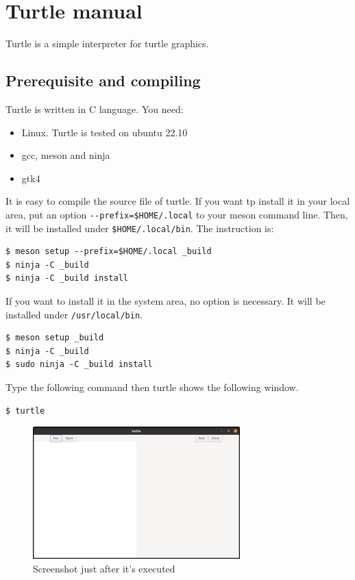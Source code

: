 \section{Turtle manual}\label{turtle-manual}

Turtle is a simple interpreter for turtle graphics.

\subsection{Prerequisite and
compiling}\label{prerequisite-and-compiling}

Turtle is written in C language. You need:

\begin{itemize}
\tightlist
\item
  Linux. Turtle is tested on ubuntu 22.10
\item
  gcc, meson and ninja
\item
  gtk4
\end{itemize}

It is easy to compile the source file of turtle. If you want tp install
it in your local area, put an option
\passthrough{\lstinline!--prefix=$HOME/.local!} to your meson command
line. Then, it will be installed under
\passthrough{\lstinline!$HOME/.local/bin!}. The instruction is:

\begin{lstlisting}
$ meson setup --prefix=$HOME/.local _build
$ ninja -C _build
$ ninja -C _build install
\end{lstlisting}

If you want to install it in the system area, no option is necessary. It
will be installed under \passthrough{\lstinline!/usr/local/bin!}.

\begin{lstlisting}
$ meson setup _build
$ ninja -C _build
$ sudo ninja -C _build install
\end{lstlisting}

Type the following command then turtle shows the following window.

\begin{lstlisting}
$ turtle
\end{lstlisting}

\begin{figure}
\centering
\includegraphics[width=8cm,height=5.11cm]{../src/turtle/image/turtle1.png}
\caption{Screenshot just after it's executed}
\end{figure}


